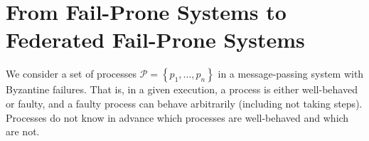\documentclass[11pt,letterpaper]{article}
\begin{document}




\appendix

\section{From Fail-Prone Systems to Federated Fail-Prone Systems}


We consider a set of processes $\mathcal{P}=\left\{p_1,...,p_n\right\}$ in a message-passing system with Byzantine failures.
That is, in a given execution, a process is either well-behaved or faulty, and a faulty process can behave arbitrarily (including not taking steps).
Processes do not know in advance which processes are well-behaved and which are not.
\end{document}
